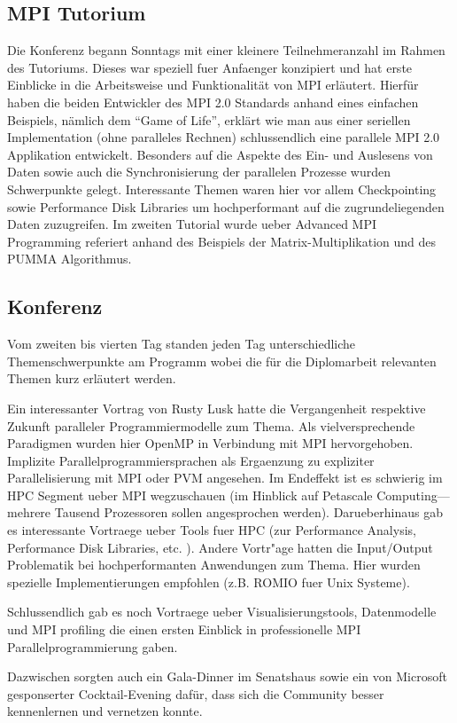 \documentclass[a4paper,fleqn]{article}
\begin{document}
\subsection{MPI Tutorium}
Die Konferenz begann Sonntags mit einer kleinere Teilnehmeranzahl im
Rahmen des Tutoriums. Dieses war speziell fuer Anfaenger konzipiert
und hat erste Einblicke in die Arbeitsweise und Funktionalität von MPI
erläutert. Hierfür haben die beiden Entwickler des MPI 2.0 Standards
anhand eines einfachen Beispiels, nämlich dem ``Game of Life'',
erklärt wie man aus einer seriellen Implementation (ohne paralleles
Rechnen) schlussendlich eine parallele MPI 2.0 Applikation
entwickelt. Besonders auf die Aspekte des Ein- und Auslesens von Daten
sowie auch die Synchronisierung der parallelen Prozesse wurden
Schwerpunkte gelegt. Interessante Themen waren hier vor allem
Checkpointing sowie Performance Disk Libraries um hochperformant auf
die zugrundeliegenden Daten zuzugreifen.
Im zweiten Tutorial wurde ueber Advanced MPI Programming referiert
anhand des Beispiels der Matrix-Multiplikation und des PUMMA
Algorithmus.

\subsection{Konferenz}
Vom zweiten bis vierten Tag standen jeden Tag unterschiedliche
Themenschwerpunkte am Programm wobei die für die Diplomarbeit
relevanten Themen kurz erläutert werden.

Ein interessanter Vortrag von Rusty Lusk hatte die Vergangenheit
respektive Zukunft paralleler Programmiermodelle zum Thema. Als
vielversprechende Paradigmen wurden hier OpenMP in Verbindung mit MPI
hervorgehoben. Implizite Parallelprogrammiersprachen als Ergaenzung zu
expliziter Parallelisierung mit MPI oder PVM angesehen. Im Endeffekt
ist es schwierig im HPC Segment ueber MPI wegzuschauen (im Hinblick
auf Petascale Computing---mehrere Tausend Prozessoren sollen
angesprochen werden). Darueberhinaus gab es interessante Vortraege
ueber Tools fuer HPC (zur Performance Analysis, Performance Disk
Libraries, etc. ). Andere Vortr"age hatten die Input/Output
Problematik bei hochperformanten Anwendungen zum Thema. Hier wurden
spezielle Implementierungen empfohlen (z.B. ROMIO fuer Unix Systeme). 

Schlussendlich gab es noch Vortraege ueber Visualisierungstools,
Datenmodelle und MPI profiling die einen ersten Einblick in
professionelle MPI Parallelprogrammierung gaben.

Dazwischen sorgten auch ein Gala-Dinner im Senatshaus sowie ein von
Microsoft gesponserter Cocktail-Evening dafür, dass sich die Community
besser kennenlernen und vernetzen konnte.
\end{document}
